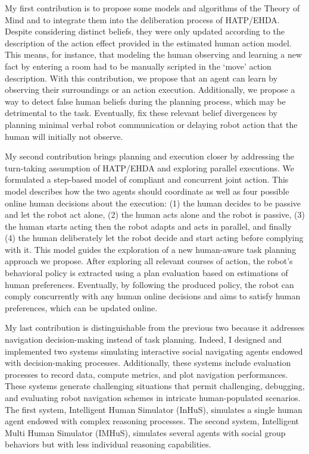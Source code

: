 My first contribution is to propose some models and algorithms of the Theory of Mind and to integrate them into the deliberation process of HATP/EHDA. Despite considering distinct beliefs, they were only updated according to the description of the action effect provided in the estimated human action model. This means, for instance, that modeling the human observing and learning a new fact by entering a room had to be manually scripted in the `move' action description. With this contribution, we propose that an agent can learn by observing their surroundings or an action execution. Additionally, we propose a way to detect false human beliefs during the planning process, which may be detrimental to the task. Eventually, fix these relevant belief divergences by planning minimal verbal robot communication or delaying robot action that the human will initially not observe.

My second contribution brings planning and execution closer by addressing the turn-taking assumption of HATP/EHDA and exploring parallel executions. We formulated a step-based model of compliant and concurrent joint action. This model describes how the two agents should coordinate as well as four possible online human decisions about the execution: (1) the human decides to be passive and let the robot act alone, (2) the human acts alone and the robot is passive, (3) the human starts acting then the robot adapts and acts in parallel, and finally (4) the human deliberately let the robot decide and start acting before complying with it. This model guides the exploration of a new human-aware task planning approach we propose. After exploring all relevant courses of action, the robot's behavioral policy is extracted using a plan evaluation based on estimations of human preferences. Eventually, by following the produced policy, the robot can comply concurrently with any human online decisions and aims to satisfy human preferences, which can be updated online.

My last contribution is distinguishable from the previous two because it addresses navigation decision-making instead of task planning. Indeed, I designed and implemented two systems simulating interactive social navigating agents endowed with decision-making processes. Additionally, these systems include evaluation processes to record data, compute metrics, and plot navigation performances. These systems generate challenging situations that permit challenging, debugging, and evaluating robot navigation schemes in intricate human-populated scenarios. The first system, Intelligent Human Simulator (InHuS), simulates a single human agent endowed with complex reasoning processes. The second system, Intelligent Multi Human Simulator (IMHuS), simulates several agents with social group behaviors but with less individual reasoning capabilities. 

